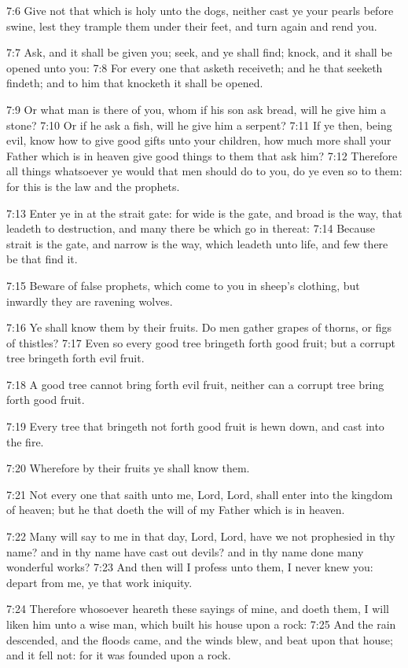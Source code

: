 7:6 Give not that which is holy unto the dogs, neither cast ye your pearls before swine, lest they trample them under their feet, and turn again and rend you.

7:7 Ask, and it shall be given you; seek, and ye shall find; knock, and it shall be opened unto you: 7:8 For every one that asketh receiveth; and he that seeketh findeth; and to him that knocketh it shall be opened.

7:9 Or what man is there of you, whom if his son ask bread, will he give him a stone?  7:10 Or if he ask a fish, will he give him a serpent?  7:11 If ye then, being evil, know how to give good gifts unto your children, how much more shall your Father which is in heaven give good things to them that ask him?  7:12 Therefore all things whatsoever ye would that men should do to you, do ye even so to them: for this is the law and the prophets.

7:13 Enter ye in at the strait gate: for wide is the gate, and broad is the way, that leadeth to destruction, and many there be which go in thereat: 7:14 Because strait is the gate, and narrow is the way, which leadeth unto life, and few there be that find it.

7:15 Beware of false prophets, which come to you in sheep's clothing, but inwardly they are ravening wolves.

7:16 Ye shall know them by their fruits. Do men gather grapes of thorns, or figs of thistles?  7:17 Even so every good tree bringeth forth good fruit; but a corrupt tree bringeth forth evil fruit.

7:18 A good tree cannot bring forth evil fruit, neither can a corrupt tree bring forth good fruit.

7:19 Every tree that bringeth not forth good fruit is hewn down, and cast into the fire.

7:20 Wherefore by their fruits ye shall know them.

7:21 Not every one that saith unto me, Lord, Lord, shall enter into the kingdom of heaven; but he that doeth the will of my Father which is in heaven.

7:22 Many will say to me in that day, Lord, Lord, have we not prophesied in thy name? and in thy name have cast out devils? and in thy name done many wonderful works?  7:23 And then will I profess unto them, I never knew you: depart from me, ye that work iniquity.

7:24 Therefore whosoever heareth these sayings of mine, and doeth them, I will liken him unto a wise man, which built his house upon a rock: 7:25 And the rain descended, and the floods came, and the winds blew, and beat upon that house; and it fell not: for it was founded upon a rock.

